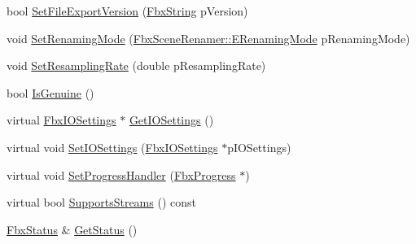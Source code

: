 \begin{DoxyCompactItemize}
\item 
bool \hyperlink{class_fbx_writer_a7f792c49a3550deb39aa994db188c47f}{Set\+File\+Export\+Version} (\hyperlink{class_fbx_string}{Fbx\+String} p\+Version)
\item 
void \hyperlink{class_fbx_writer_aba927b8b74b98fae0074662a2924a6b0}{Set\+Renaming\+Mode} (\hyperlink{class_fbx_scene_renamer_a9279ee1a645d6499b934adbc376f8678}{Fbx\+Scene\+Renamer\+::\+E\+Renaming\+Mode} p\+Renaming\+Mode)
\item 
void \hyperlink{class_fbx_writer_aeed0e237cbed7c5ae6c29aa78932dbe6}{Set\+Resampling\+Rate} (double p\+Resampling\+Rate)
\item 
bool \hyperlink{class_fbx_writer_a030c374bcc699993ea32225a4624532a}{Is\+Genuine} ()
\item 
virtual \hyperlink{class_fbx_i_o_settings}{Fbx\+I\+O\+Settings} $\ast$ \hyperlink{class_fbx_writer_abc22ed1c0a22f00d850fb83a4572bf16}{Get\+I\+O\+Settings} ()
\item 
virtual void \hyperlink{class_fbx_writer_acdc632472e0252b6087fd55ef05a7e2a}{Set\+I\+O\+Settings} (\hyperlink{class_fbx_i_o_settings}{Fbx\+I\+O\+Settings} $\ast$p\+I\+O\+Settings)
\item 
virtual void \hyperlink{class_fbx_writer_a1a3cf241a0c11364981ebd23be59fd8f}{Set\+Progress\+Handler} (\hyperlink{class_fbx_progress}{Fbx\+Progress} $\ast$)
\item 
virtual bool \hyperlink{class_fbx_writer_aa79a285227d113ee6d64aee6a84986cd}{Supports\+Streams} () const
\item 
\hyperlink{class_fbx_status}{Fbx\+Status} \& \hyperlink{class_fbx_writer_a688d905ebbebe4536f31c87b55edf67b}{Get\+Status} ()
\end{DoxyCompactItemize}
